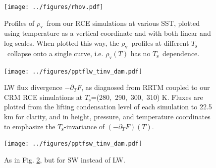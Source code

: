 \documentclass[10pt]{article}
\newcommand{\ppt}{\ensuremath{\partial_T}}
\newcommand{\rhov}{\ensuremath{\rho_\mathrm{v}}}
\newcommand{\Ts}{\ensuremath{T_\mathrm{s}}}
\begin{document}
\pagebreak

\begin{figure}[h]
	\begin{center}
			\texttt{[image: ../figures/rhov.pdf]}
		\caption{Profiles of \rhov\ from our RCE simulations at various SST, plotted using temperature as a vertical coordinate and with both linear and log scales. When plotted this way, the \rhov\ profiles at different \Ts\ collapse onto a single curve, i.e. $\rhov(T)$ has no \Ts\ dependence. 
		\label{rhov_fig}
		}
	\end{center}
\end{figure}



\begin{figure}[h]
	\begin{center}
			\texttt{[image: ../figures/pptflw\_tinv\_dam.pdf]}
		\caption{LW flux divergence  $-\ppt F$, as diagnosed from RRTM coupled to our CRM RCE simulations at \Ts=(280,\ 290,\ 300,\ 310) K. Fluxes are plotted from the lifting condensation level of each simulation to 22.5 km for clarity, and  in height, pressure, and temperature coordinates to emphasize the \Ts-invariance of  $(-\ppt F)(T)$.
		\label{pptflw_tinv_dam}
		}
	\end{center}
\end{figure}

\begin{figure}[h]
	\begin{center}
			\texttt{[image: ../figures/pptfsw\_tinv\_dam.pdf]}
		\caption{As in Fig. \ref{pptflw_tinv_dam}, but for SW instead of LW.
		\label{pptfsw_tinv_dam}
		}
	\end{center}
\end{figure}
\end{document}
